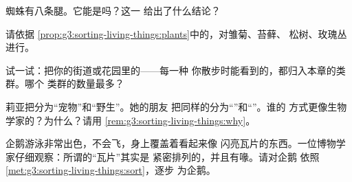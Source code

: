 \begin{exercise}[$\star$]\label{exo:g3:sorting-living-things:6}
蜘蛛有八条腿。它能是吗？这一
给出了什么结论？
\end{exercise}

\begin{exercise}[$\star$]\label{exo:g3:sorting-living-things:7}
请依据
\cref{prop:g3:sorting-living-things:plants}中的，对雏菊、苔藓、
松树、玫瑰丛进行。
\end{exercise}

\begin{exercise}[$\star$]\label{exo:g3:sorting-living-things:8}
试一试：把你的街道或花园里的——每一种
你散步时能看到的，都归入本章的类群。哪个
类群的数量最多？
\end{exercise}

\begin{exercise}[$\star\star$]\label{exo:g3:sorting-living-things:9}
莉亚把分为“宠物”和“野生”。她的朋友
把同样的分为“”和“”。谁的
方式更像生物学家的？为什么？请用
\cref{rem:g3:sorting-living-things:why}。
\end{exercise}

\begin{exercise}[$\star\star$]\label{exo:g3:sorting-living-things:10}
企鹅游泳非常出色，不会飞，身上覆盖着看起来像
闪亮瓦片的东西。一位博物学家仔细观察：所谓的“瓦片”其实是
紧密排列的，并且有喙。请对企鹅
依照\cref{met:g3:sorting-living-things:sort}，逐步
为企鹅。
\end{exercise}
